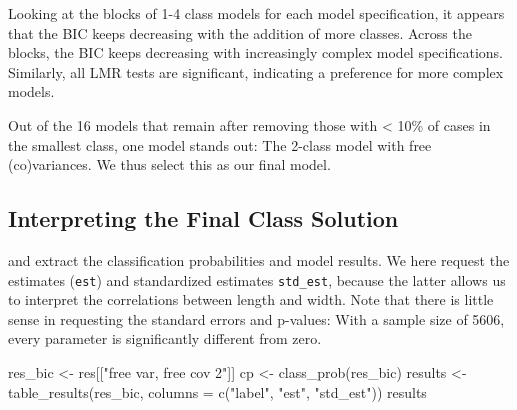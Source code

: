 \documentclass[
  man,floatsintext]{apa6}
\newenvironment{Shaded}{\begin{snugshade}}{\end{snugshade}}
\newcommand{\AttributeTok}[1]{\textcolor[rgb]{0.77,0.63,0.00}{#1}}
\newcommand{\FunctionTok}[1]{\textcolor[rgb]{0.00,0.00,0.00}{#1}}
\newcommand{\NormalTok}[1]{#1}
\newcommand{\OtherTok}[1]{\textcolor[rgb]{0.56,0.35,0.01}{#1}}
\newcommand{\StringTok}[1]{\textcolor[rgb]{0.31,0.60,0.02}{#1}}
\begin{document}
Looking at the blocks of 1-4 class models for each model specification, it appears that the BIC keeps decreasing with the addition of more classes.
Across the blocks, the BIC keeps decreasing with increasingly complex model specifications.
Similarly, all LMR tests are significant, indicating a preference for more complex models.

Out of the 16 models that remain after removing those with \textless{} 10\% of cases in the smallest class, one model stands out: The 2-class model with free (co)variances.
We thus select this as our final model.

\hypertarget{interpreting-the-final-class-solution}{%
\subsection{Interpreting the Final Class Solution}\label{interpreting-the-final-class-solution}}

and extract the classification probabilities and model results.
We here request the estimates (\texttt{est}) and standardized estimates \texttt{std\_est}, because the latter allows us to interpret the correlations between length and width.
Note that there is little sense in requesting the standard errors and p-values: With a sample size of 5606, every parameter is significantly different from zero.

\begin{Shaded}
\begin{Highlighting}[]
\NormalTok{res\_bic }\OtherTok{\textless{}{-}}\NormalTok{ res[[}\StringTok{"free var, free cov 2"}\NormalTok{]]}
\NormalTok{cp }\OtherTok{\textless{}{-}} \FunctionTok{class\_prob}\NormalTok{(res\_bic)}
\NormalTok{results }\OtherTok{\textless{}{-}} \FunctionTok{table\_results}\NormalTok{(res\_bic, }\AttributeTok{columns =} \FunctionTok{c}\NormalTok{(}\StringTok{"label"}\NormalTok{, }\StringTok{"est"}\NormalTok{, }\StringTok{"std\_est"}\NormalTok{))}
\NormalTok{results}
\end{Highlighting}
\end{Shaded}
\end{document}

